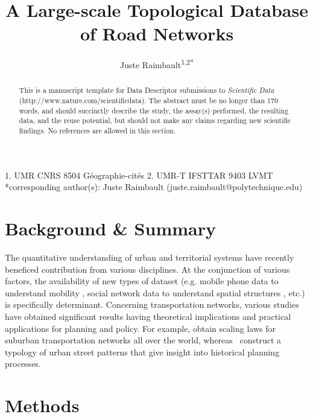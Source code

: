 \documentclass[english]{article}
\begin{document}
\title{A Large-scale Topological Database of Road Networks%
}

\author{Juste Raimbault\textsuperscript{1,2{*}}}

\maketitle
\thispagestyle{fancy}

1. UMR CNRS 8504 G{\'e}ographie-cit{\'e}s 2. UMR-T IFSTTAR 9403 LVMT {*}corresponding author(s):
Juste Raimbault (juste.raimbault@polytechnique.edu)


\begin{abstract}
This is a manuscript template for Data Descriptor submissions to \emph{Scientific
Data} (http://www.nature.com/scientificdata). The abstract must be
no longer than 170 words, and should succinctly describe the study,
the assay(s) performed, the resulting data, and the reuse potential,
but should not make any claims regarding new scientific findings.
No references are allowed in this section. 
\end{abstract}

\section*{Background \& Summary}

The quantitative understanding of urban and territorial systems have recently beneficed contribution from various disciplines. At the conjunction of various factors, the availability of new types of dataset (e.g. mobile phone data to understand mobility %
, social network data to understand spatial structures %
, etc.) is specifically determinant. Concerning transportation networks, various studies have obtained significant results having theoretical implications and practical applications for planning and policy. For example, \cite{10.1371/journal.pone.0102007} obtain scaling laws for suburban transportation networks all over the world, whereas~\cite{louf2014typology} construct a typology of urban street patterns that give insight into historical planning processes.


\section*{Methods}
\end{document}
